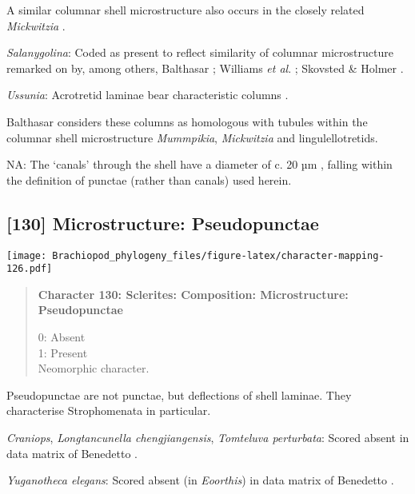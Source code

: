 \documentclass[openany]{book}
\theoremstyle{definition}
\theoremstyle{definition}
\theoremstyle{definition}
\theoremstyle{remark}
\begin{document}
A similar columnar shell microstructure also occurs in the closely
related \emph{Mickwitzia} \citep{Balthasar2008iMummpikia}.

\hypertarget{Salanygolina-coding-129}{}
\emph{Salanygolina}: Coded as present to reflect similarity of columnar
microstructure remarked on by, among others, Balthasar
\citeyearpar{Balthasar2008iMummpikia}; Williams \emph{et al}.
\citeyearpar{Williams2007Supplement}; Skovsted \& Holmer
\citeyearpar{Skovsted2003EarlyCambrian}.

\hypertarget{Ussunia-coding-129}{}
\emph{Ussunia}: Acrotretid laminae bear characteristic columns
\citep[e.g.][]{Zhang2016Epithelialcell}.

Balthasar \citeyearpar{Balthasar2008iMummpikia} considers these columns
as homologous with tubules within the columnar shell microstructure
\emph{Mummpikia}, \emph{Mickwitzia} and lingulellotretids.

\hypertarget{NA-coding-129}{}
NA: The `canals' through the shell have a diameter of c. 20 µm
\citep[text-fig. 2a]{Williams2004Chemicostructure}, falling within the
definition of punctae (rather than canals) used herein.

\subsection*{{[}130{]} Microstructure:
Pseudopunctae}\label{microstructure-pseudopunctae}

\texttt{[image: Brachiopod\_phylogeny\_files/figure-latex/character-mapping-126.pdf]}

\begin{quote}
\textbf{Character 130: Sclerites: Composition: Microstructure:
Pseudopunctae}

0: Absent\\
1: Present\\
Neomorphic character.
\end{quote}

Pseudopunctae are not punctae, but deflections of shell laminae. They
characterise Strophomenata in particular.

\hypertarget{Craniops-coding-130}{}
\emph{Craniops}, \emph{Longtancunella chengjiangensis}, \emph{Tomteluva
perturbata}: Scored absent in data matrix of Benedetto
\citeyearpar{Benedetto2009iChaniella}.

\hypertarget{Yuganotheca_elegans-coding-130}{}
\emph{Yuganotheca elegans}: Scored absent (in \emph{Eoorthis}) in data
matrix of Benedetto \citeyearpar{Benedetto2009iChaniella}.
\end{document}

